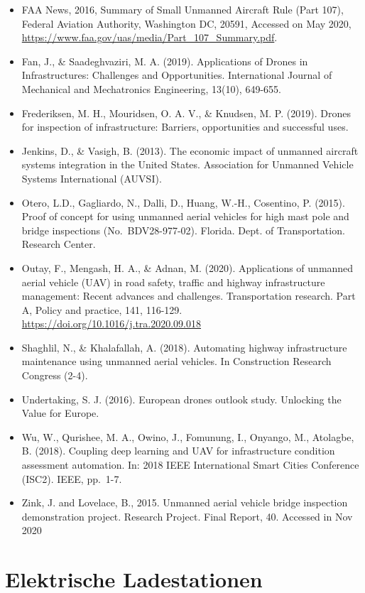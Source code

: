 \documentclass[
]{book}
\providecommand{\tightlist}{%
  \setlength{\itemsep}{0pt}\setlength{\parskip}{0pt}}
\begin{document}
\begin{itemize}
\tightlist
\item
  FAA News, 2016, Summary of Small Unmanned Aircraft Rule (Part 107), Federal Aviation Authority, Washington DC, 20591, Accessed on May 2020, \url{https://www.faa.gov/uas/media/Part_107_Summary.pdf}.
\item
  Fan, J., \& Saadeghvaziri, M. A. (2019). Applications of Drones in Infrastructures: Challenges and Opportunities. International Journal of Mechanical and Mechatronics Engineering, 13(10), 649-655.
\item
  Frederiksen, M. H., Mouridsen, O. A. V., \& Knudsen, M. P. (2019). Drones for inspection of infrastructure: Barriers, opportunities and successful uses.
\item
  Jenkins, D., \& Vasigh, B. (2013). The economic impact of unmanned aircraft systems integration in the United States. Association for Unmanned Vehicle Systems International (AUVSI).
\item
  Otero, L.D., Gagliardo, N., Dalli, D., Huang, W.-H., Cosentino, P. (2015). Proof of concept for using unmanned aerial vehicles for high mast pole and bridge inspections (No.~BDV28-977-02). Florida. Dept. of Transportation. Research Center.
\item
  Outay, F., Mengash, H. A., \& Adnan, M. (2020). Applications of unmanned aerial vehicle (UAV) in road safety, traffic and highway infrastructure management: Recent advances and challenges. Transportation research. Part A, Policy and practice, 141, 116-129. \url{https://doi.org/10.1016/j.tra.2020.09.018}
\item
  Shaghlil, N., \& Khalafallah, A. (2018). Automating highway infrastructure maintenance using unmanned aerial vehicles. In Construction Research Congress (2-4).
\item
  Undertaking, S. J. (2016). European drones outlook study. Unlocking the Value for Europe.
\item
  Wu, W., Qurishee, M. A., Owino, J., Fomunung, I., Onyango, M., Atolagbe, B. (2018). Coupling deep learning and UAV for infrastructure condition assessment automation. In: 2018 IEEE International Smart Cities Conference (ISC2). IEEE, pp.~1-7.
\item
  Zink, J. and Lovelace, B., 2015. Unmanned aerial vehicle bridge inspection demonstration project. Research Project. Final Report, 40. Accessed in Nov 2020
\end{itemize}

\hypertarget{charging_station}{%
\section{Elektrische Ladestationen}\label{charging_station}}
\end{document}
